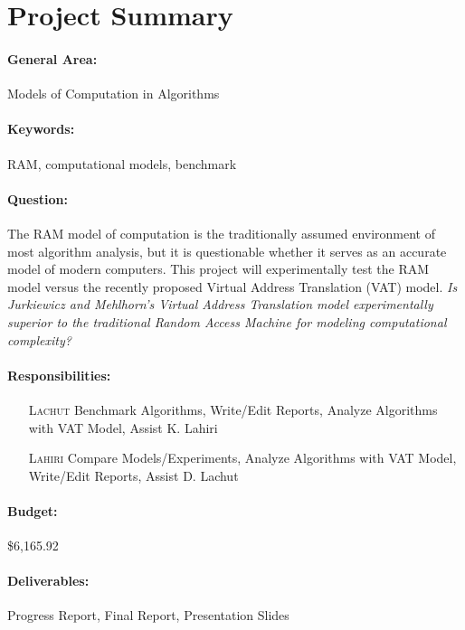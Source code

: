\maketitle

\section{Project Summary}

\paragraph{General Area:} Models of Computation in Algorithms

\paragraph{Keywords:} RAM, computational models, benchmark

\paragraph{Question:} The RAM model of computation is the traditionally
assumed environment of most algorithm analysis, but it is questionable whether
it serves as an accurate model of modern computers. This project will
experimentally test the RAM model versus the recently proposed Virtual Address
Translation (VAT) model.
\emph{Is Jurkiewicz and Mehlhorn's Virtual Address Translation model
experimentally superior to the traditional Random Access Machine for modeling
computational complexity?}

\paragraph{Responsibilities:}
  \begin{itemize}
    \item[\textsc{Lachut}] Benchmark Algorithms, Write/Edit Reports, Analyze
    Algorithms with VAT Model, Assist K. Lahiri
    \item[\textsc{Lahiri}] Compare Models/Experiments, Analyze Algorithms with
    VAT Model, Write/Edit Reports, Assist D. Lachut
  \end{itemize}

\paragraph{Budget:} \$6,165.92

\paragraph{Deliverables:} Progress Report, Final Report, Presentation Slides